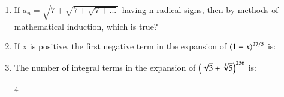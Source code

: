 \documentclass[journal,12pt,twocolumn]{IEEEtran}
\theoremstyle{remark}
\begin{document}
\begin{enumerate}
	\hfill{}
	\begin{enumerate}[label=(\alph*)]
	\end{enumerate}
\item If $a_n = \sqrt{7+\sqrt{7+\sqrt{7+...}}}$ having n radical signs, then by methods of mathematical induction, which is true?
	\hfill{}
	\begin{enumerate}[label=(\alph*)]
	\end{enumerate}
\item If x is positive, the first negative term in the expansion of $\left(1+x\right)^{27/5}$ is:
	\hfill{}
	\begin{enumerate}[label=(\alph*)]
	\end{enumerate}
\item The number of integral terms in the expansion of $\left(\sqrt{3}+\sqrt[8]{5}\right)^{256}$ is:
	\hfill{}
	\begin{enumerate}[label=(\alph*)]
			{4}
	\end{enumerate}
\end{enumerate}
\end{document}
